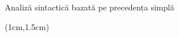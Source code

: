 \documentclass[pdf]{beamer}
\begin{document}
\begin{frame}{Analiză sintactică bazată pe precedența simplă}
\tiny{
\begin{textblock*}{14cm}(1cm,1.5cm)

\end{textblock*}
}
\end{frame}
\end{document}
